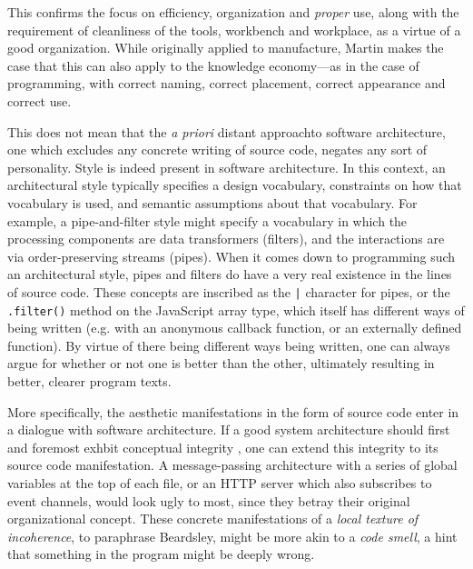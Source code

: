 This confirms the focus on efficiency, organization and \emph{proper} use, along with the requirement of cleanliness of the tools, workbench and workplace, as a virtue of a good organization. While originally applied to manufacture, Martin makes the case that this can also apply to the knowledge economy—as in the case of programming, with correct naming, correct placement, correct appearance and correct use.

This does not mean that the \emph{a priori} distant approachto software architecture, one which excludes any concrete writing of source code, negates any sort of personality. Style is indeed present in software architecture. In this context, an architectural style typically specifies a design vocabulary, constraints on how that vocabulary is used, and semantic assumptions about that vocabulary. For example, a pipe-and-filter style might specify a vocabulary in which the processing components are data transformers (filters), and the interactions are via order-preserving streams (pipes). When it comes down to programming such an architectural style, pipes and filters do have a very real existence in the lines of source code. These concepts are inscribed as the \lstinline{|} character for pipes, or the \lstinline{.filter()} method on the JavaScript array type, which itself has different ways of being written (e.g. with an anonymous callback function, or an externally defined function). By virtue of there being different ways being written, one can always argue for whether or not one is better than the other, ultimately resulting in better, clearer program texts.

More specifically, the aesthetic manifestations in the form of source code enter in a dialogue with software architecture. If a good system architecture should first and foremost exhbit conceptual integrity \citep{spinellis_beautiful_2009}, one can extend this integrity to its source code manifestation. A message-passing architecture with a series of global variables at the top of each file, or an HTTP server which also subscribes to event channels, would look ugly to most, since they betray their original organizational concept. These concrete manifestations of a \emph{local texture of incoherence}, to paraphrase Beardsley, might be more akin to a \emph{code smell}, a hint that something in the program might be deeply wrong.

